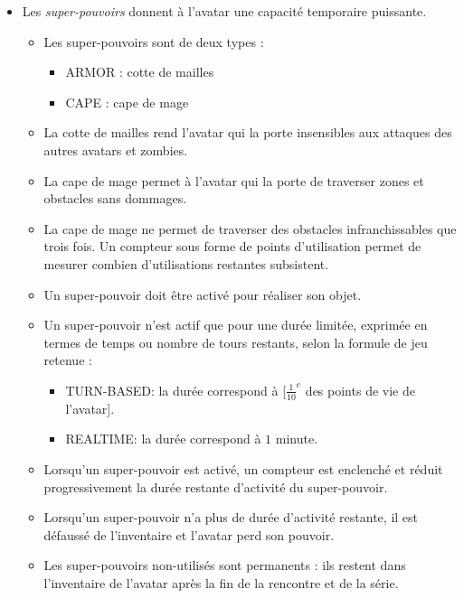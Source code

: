 \begin{itemize}
        \item Les \textit{super-pouvoirs} donnent à l'avatar une capacité temporaire puissante.
            \begin{itemize}
                \item Les super-pouvoirs sont de deux types :
                    \begin{itemize}
                        \item ARMOR : cotte de mailles
                        \item CAPE : cape de mage
                    \end{itemize}
                \item La cotte de mailles rend l'avatar qui la porte insensibles aux attaques des autres avatars et zombies.
                \item La cape de mage permet à l'avatar qui la porte de traverser zones et obstacles sans dommages.
                \item La cape de mage ne permet de traverser des obstacles infranchissables que trois fois. Un compteur sous forme de points d'utilisation permet de mesurer combien d'utilisations restantes subsistent.
                \item Un super-pouvoir doit être activé pour réaliser son objet.
                \item Un super-pouvoir n'est actif que pour une durée limitée, exprimée en termes de temps ou nombre de tours restants, selon la formule de jeu retenue :
                \begin{itemize}
                    \item TURN-BASED: la durée correspond à [$\frac{1}{10}^e$ des points de vie de l'avatar].
                    \item REALTIME:   la durée correspond à $1$ minute.
                \end{itemize}
                \item Lorsqu'un super-pouvoir est activé, un compteur est enclenché et réduit progressivement la durée restante d'activité du super-pouvoir.
                \item Lorsqu'un super-pouvoir n'a plus de durée d'activité restante, il est défaussé de l'inventaire et l'avatar perd son pouvoir.
                \item Les super-pouvoirs non-utilisés sont permanents : ils restent dans l'inventaire de l'avatar après la fin de la rencontre et de la série.
            \end{itemize}
            

\end{itemize}
